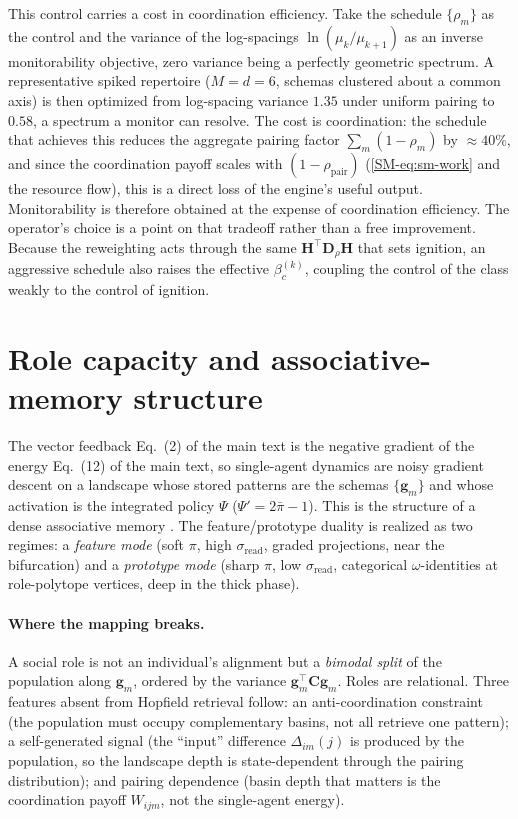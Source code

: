 \documentclass[
  aps,prx,
  preprint,
  superscriptaddress,
  nofootinbib
]{revtex4-2}
\newcommand{\g}{\mathbf{g}}
\newcommand{\C}{\mathbf{C}}
\newcommand{\rhopair}{\rho_{\mathrm{pair}}}
\newcommand{\sread}{\sigma_{\mathrm{read}}}
\newcommand{\pibar}{\bar\pi}
\begin{document}
This control carries a cost in coordination efficiency. Take the schedule $\{\rho_m\}$ as the control and the variance of the log-spacings $\ln(\mu_k/\mu_{k+1})$ as an inverse monitorability objective, zero variance being a perfectly geometric spectrum. A representative spiked repertoire ($M=d=6$, schemas clustered about a common axis) is then optimized from log-spacing variance $1.35$ under uniform pairing to $0.58$, a spectrum a monitor can resolve. The cost is coordination: the schedule that achieves this reduces the aggregate pairing factor $\sum_m (1-\rho_m)$ by $\approx40\%$, and since the coordination payoff scales with $(1-\rhopair)$ (\cref{SM-eq:sm-work} and the resource flow), this is a direct loss of the engine's useful output. Monitorability is therefore obtained at the expense of coordination efficiency. The operator's choice is a point on that tradeoff rather than a free improvement. Because the reweighting acts through the same $\bm{H}^{\!\top}\bm{D}_\rho\bm{H}$ that sets ignition, an aggressive schedule also raises the effective $\beta_c^{(k)}$, coupling the control of the class weakly to the control of ignition.



\section{Role capacity and associative-memory structure}\label{sm:capacity}

\noindent The vector feedback Eq.~(2) of the main text is the negative gradient of the energy Eq.~(12) of the main text, so single-agent dynamics are noisy gradient descent on a landscape whose stored patterns are the schemas $\{\g_m\}$ and whose activation is the integrated policy $\Psi$ ($\Psi'=2\pibar-1$). This is the structure of a dense associative memory \cite{krotov2016}. The feature/prototype duality is realized as two regimes: a \emph{feature mode} (soft $\pi$, high $\sread$, graded projections, near the bifurcation) and a \emph{prototype mode} (sharp $\pi$, low $\sread$, categorical $\omega$-identities at role-polytope vertices, deep in the thick phase).

\paragraph{Where the mapping breaks.} A social role is not an individual's alignment but a \emph{bimodal split} of the population along $\g_m$, ordered by the variance $\g_m^{\!\top}\C\g_m$. Roles are relational. Three features absent from Hopfield retrieval follow: an anti-coordination constraint (the population must occupy complementary basins, not all retrieve one pattern); a self-generated signal (the ``input'' difference $\Delta_{im}(j)$ is produced by the population, so the landscape depth is state-dependent through the pairing distribution); and pairing dependence (basin depth that matters is the coordination payoff $W_{ijm}$, not the single-agent energy).
\end{document}
